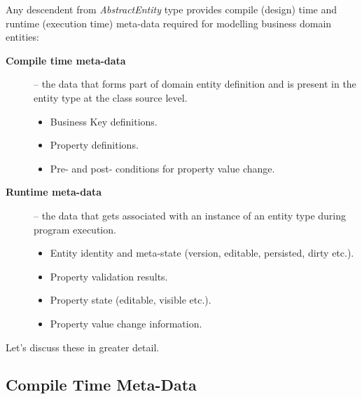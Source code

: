   Any descendent from \emph{AbstractEntity} type provides compile (design) time and runtime (execution time) meta-data required for modelling business domain entities:
  \begin{description}
   \item[\textbf{Compile time meta-data}] -- the data that forms part of domain entity definition and is present in the entity type at the class source level.
      \begin{itemize}
	\item Business Key definitions.
	\item Property definitions.
	\item Pre- and post- conditions for property value change.
      \end{itemize}

   \item[\textbf{Runtime meta-data}] -- the data that gets associated with an instance of an entity type during program execution.
      \begin{itemize}
	\item Entity identity and meta-state (version, editable, persisted, dirty etc.).
	\item Property validation results.
	\item Property state (editable, visible etc.).	
	\item Property value change information.	
      \end{itemize}
   \end{description}

  Let's discuss these in greater detail.

\subsection{Compile Time Meta-Data}
  
